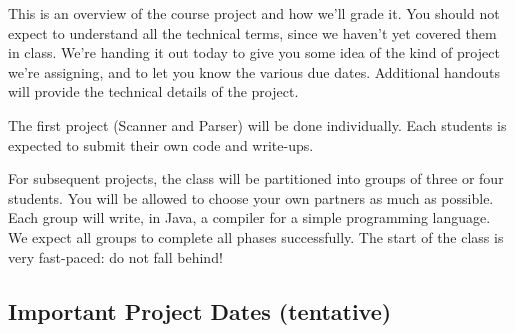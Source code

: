 



This is an overview of the course project and how we'll grade it. You should
not expect to understand all the technical terms, since we haven't yet covered
them in class.  We're handing it out today to give you some idea of the
kind of project we're assigning, and to let you know the various due dates.
Additional handouts will provide the technical details of the project.

The first project (Scanner and Parser) will be done individually.
Each students is expected to submit their own code and write-ups.

For subsequent projects, the class will be partitioned into groups of
three or four students.  You will be allowed to choose your own partners as
much as possible.  Each group will write, in Java, a compiler for a simple
programming language. We expect all groups to complete all phases successfully.
The start of the class is very fast-paced: do not fall behind!

\subsection*{Important Project Dates (tentative)}

